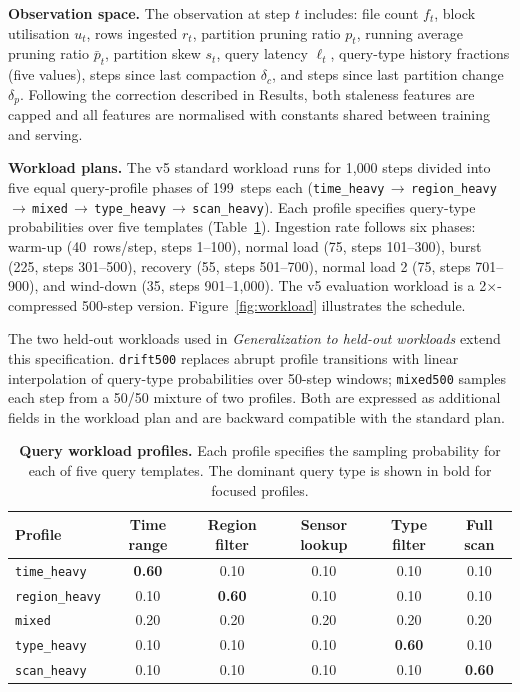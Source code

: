 \documentclass[fleqn,10pt]{wlscirep}
\begin{document}
\textbf{Observation space.}
The observation at step $t$ includes: file count $f_t$, block
utilisation $u_t$, rows ingested $r_t$, partition pruning ratio $p_t$,
running average pruning ratio $\bar{p}_t$, partition skew $s_t$, query
latency $\ell_t$, query-type history fractions (five values), steps
since last compaction $\delta_c$, and steps since last partition change
$\delta_p$. Following the correction described in Results, both
staleness features are capped and all features are normalised with
constants shared between training and serving.

\textbf{Workload plans.}
The v5 standard workload runs for 1{,}000 steps divided into five equal
query-profile phases of 199~steps each
(\texttt{time\_heavy}\,$\to$\,\texttt{region\_heavy}\,$\to$\,\texttt{mixed}\,$\to$\,\texttt{type\_heavy}\,$\to$\,\texttt{scan\_heavy}).
Each profile specifies query-type probabilities over five templates
(Table~\ref{tab:profiles}). Ingestion rate follows six phases:
warm-up (40~rows/step, steps 1--100), normal load (75, steps 101--300),
burst (225, steps 301--500), recovery (55, steps 501--700),
normal load 2 (75, steps 701--900), and wind-down (35, steps 901--1{,}000).
The v5 evaluation workload is a 2$\times$-compressed 500-step version.
Figure~\ref{fig:workload} illustrates the schedule.

The two held-out workloads used in \emph{Generalization to held-out
workloads}
extend this specification. \texttt{drift500} replaces abrupt profile
transitions with linear interpolation of query-type probabilities over
50-step windows; \texttt{mixed500} samples each step from a 50/50
mixture of two profiles. Both are expressed as additional fields in the
workload plan and are backward compatible with the standard plan.

\begin{table}[!htbp]
\centering
\begin{tabular}{lccccc}
\toprule
\textbf{Profile} & \textbf{Time range} & \textbf{Region filter} &
  \textbf{Sensor lookup} & \textbf{Type filter} & \textbf{Full scan} \\
\midrule
\texttt{time\_heavy}   & \textbf{0.60} & 0.10 & 0.10 & 0.10 & 0.10 \\
\texttt{region\_heavy} & 0.10 & \textbf{0.60} & 0.10 & 0.10 & 0.10 \\
\texttt{mixed}         & 0.20 & 0.20          & 0.20 & 0.20 & 0.20 \\
\texttt{type\_heavy}   & 0.10 & 0.10          & 0.10 & \textbf{0.60} & 0.10 \\
\texttt{scan\_heavy}   & 0.10 & 0.10          & 0.10 & 0.10 & \textbf{0.60} \\
\bottomrule
\end{tabular}
\caption{\label{tab:profiles}\textbf{Query workload profiles.}
  Each profile specifies the sampling probability for each of five query
  templates. The dominant query type is shown in bold for focused
  profiles.}
\end{table}
\end{document}
